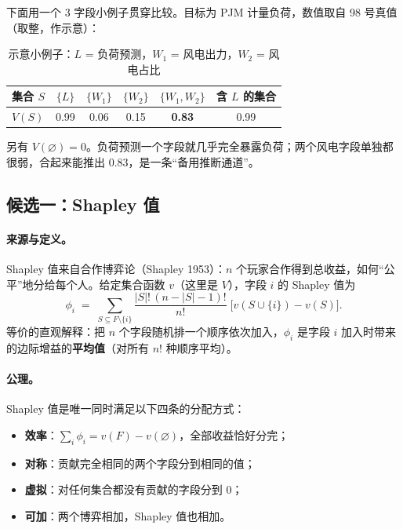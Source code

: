 \documentclass[zihao=-4,a4paper]{ctexart}
\begin{document}
下面用一个 3 字段小例子贯穿比较。目标为 PJM 计量负荷，数值取自 98 号真值（取整，作示意）：

\begin{table}[H]\centering
\caption{示意小例子：$L$ = 负荷预测，$W_1$ = 风电出力，$W_2$ = 风电占比}
\begin{tabular}{lccccc}
\toprule
集合 $S$ & $\{L\}$ & $\{W_1\}$ & $\{W_2\}$ & $\{W_1,W_2\}$ & 含 $L$ 的集合 \\
\midrule
$V(S)$ & 0.99 & 0.06 & 0.15 & \textbf{0.83} & 0.99 \\
\bottomrule
\end{tabular}
\end{table}

另有 $V(\varnothing)=0$。负荷预测一个字段就几乎完全暴露负荷；两个风电字段单独都很弱，合起来能推出 0.83，是一条“备用推断通道”。

\subsection{候选一：Shapley 值}

\paragraph{来源与定义。}Shapley 值来自合作博弈论（Shapley 1953）\cite{shapley1953}：$n$ 个玩家合作得到总收益，如何“公平”地分给每个人。给定集合函数 $v$（这里是 $V$），字段 $i$ 的 Shapley 值为
\[
  \phi_i \;=\; \sum_{S\subseteq F\setminus\{i\}} \frac{|S|!\,(n-|S|-1)!}{n!}\;\big[v(S\cup\{i\})-v(S)\big].
\]
等价的直观解释：把 $n$ 个字段随机排一个顺序依次加入，$\phi_i$ 是字段 $i$ 加入时带来的边际增益的\textbf{平均值}（对所有 $n!$ 种顺序平均）。

\paragraph{公理。}Shapley 值是唯一同时满足以下四条的分配方式：
\begin{itemize}[leftmargin=*]
  \item \textbf{效率}：$\sum_i \phi_i = v(F)-v(\varnothing)$，全部收益恰好分完；
  \item \textbf{对称}：贡献完全相同的两个字段分到相同的值；
  \item \textbf{虚拟}：对任何集合都没有贡献的字段分到 0；
  \item \textbf{可加}：两个博弈相加，Shapley 值也相加。
\end{itemize}
\end{document}
